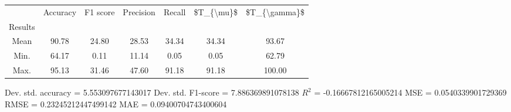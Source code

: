 \begin{tabular}{|c|c|c|c|c|c|c|}
\toprule
{} &  Accuracy &  F1 score &  Precision &  Recall &  \$T\_\{\textbackslash mu\}\$ &  \$T\_\{\textbackslash gamma\}\$ \\
Results &           &           &            &         &            &               \\
\hline
Mean    &     90.78 &     24.80 &      28.53 &   34.34 &      34.34 &         93.67 \\
Min.    &     64.17 &      0.11 &      11.14 &    0.05 &       0.05 &         62.79 \\
Max.    &     95.13 &     31.46 &      47.60 &   91.18 &      91.18 &        100.00 \\
\bottomrule
\end{tabular}

 Dev. std. accuracy = 5.553097677143017
 Dev. std. F1-score = 7.886369891078138
 $R^2$ = -0.16667812165005214
 MSE = 0.0540339901729369
 RMSE = 0.23245212447499142
 MAE = 0.09400704743400604